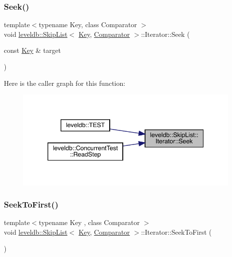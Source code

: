 \subsubsection{\texorpdfstring{Seek()}{Seek()}}
{\footnotesize\ttfamily template$<$typename Key, class Comparator $>$ \\
void \mbox{\hyperlink{classleveldb_1_1_skip_list}{leveldb\+::\+Skip\+List}}$<$ \mbox{\hyperlink{namespaceleveldb_a7e9a9725b13fa0bd922d885280dfab95}{Key}}, \mbox{\hyperlink{structleveldb_1_1_comparator}{Comparator}} $>$\+::Iterator\+::\+Seek (\begin{DoxyParamCaption}\item[{const \mbox{\hyperlink{namespaceleveldb_a7e9a9725b13fa0bd922d885280dfab95}{Key}} \&}]{target }\end{DoxyParamCaption})\hspace{0.3cm}{\ttfamily [inline]}}

Here is the caller graph for this function\+:
\nopagebreak
\begin{figure}[H]
\begin{center}
\leavevmode
\includegraphics[width=331pt]{classleveldb_1_1_skip_list_1_1_iterator_a6c641d5cd37386abdb0aa8d73454611a_icgraph}
\end{center}
\end{figure}
\mbox{\label{classleveldb_1_1_skip_list_1_1_iterator_adf69c04f0480a66f10a125c49e19caa7}} 
\subsubsection{\texorpdfstring{SeekToFirst()}{SeekToFirst()}}
{\footnotesize\ttfamily template$<$typename Key , class Comparator $>$ \\
void \mbox{\hyperlink{classleveldb_1_1_skip_list}{leveldb\+::\+Skip\+List}}$<$ \mbox{\hyperlink{namespaceleveldb_a7e9a9725b13fa0bd922d885280dfab95}{Key}}, \mbox{\hyperlink{structleveldb_1_1_comparator}{Comparator}} $>$\+::Iterator\+::\+Seek\+To\+First (\begin{DoxyParamCaption}{ }\end{DoxyParamCaption})\hspace{0.3cm}{\ttfamily [inline]}}

